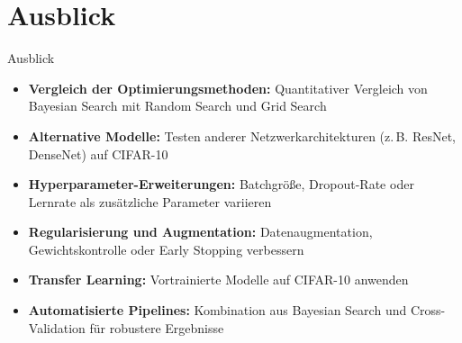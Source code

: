 \section{Ausblick}

\begin{frame}{Ausblick}
\begin{itemize}
    \item \textbf{Vergleich der Optimierungsmethoden:} 
          Quantitativer Vergleich von Bayesian Search mit Random Search und Grid Search
    \item \textbf{Alternative Modelle:} 
          Testen anderer Netzwerkarchitekturen (z. B. ResNet, DenseNet) auf CIFAR-10
    \item \textbf{Hyperparameter-Erweiterungen:} 
          Batchgröße, Dropout-Rate oder Lernrate als zusätzliche Parameter variieren
    \item \textbf{Regularisierung und Augmentation:} 
          Datenaugmentation, Gewichtskontrolle oder Early Stopping verbessern
    \item \textbf{Transfer Learning:} 
          Vortrainierte Modelle auf CIFAR-10 anwenden
    \item \textbf{Automatisierte Pipelines:} 
          Kombination aus Bayesian Search und Cross-Validation für robustere Ergebnisse
\end{itemize}
\end{frame}
